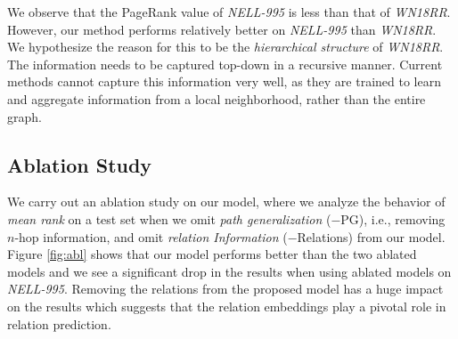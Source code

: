 \documentclass[11pt,a4paper]{article}
\begin{document}
We observe that the PageRank value of \emph{NELL-995} is less than that of \emph{WN18RR}. However, our method performs relatively better on \emph{NELL-995} than \emph{WN18RR}. We hypothesize the reason for this to be the \emph{hierarchical structure} of \emph{WN18RR}. The information needs to be captured top-down in a recursive manner. Current methods cannot capture this information very well, as they are trained to learn and aggregate information from a local neighborhood, rather than the entire graph. 
\fi

\begin{comment}
\begin{table}[t!]
\centering
\setlength{\tabcolsep}{6pt} \renewcommand{\arraystretch}{1} \begin{tabular}{l|c|c|c}
\hline
 Ablative & \multicolumn{3}{c}{NELL-995} \\
 \hline
 & 800 & 1500 & 3000 \\ 
\hline
Our model      & 1715  & 1587 & 1494   \\ 
\(-\)PG        & 1778  & 1630 & 1590    \\ 
\(-\)Relations & 5480  & 5346 & 5181     \\  

\hline
\end{tabular}
\caption{Comparison of our model with two ablated models: \(-\)PG and \(-\)Relations on test set Mean Rank (MR).  
  }
\end{table}
\end{comment}




\subsection{Ablation Study}
\label{sec:ablation}
We carry out an ablation study on our model, where we analyze the behavior of \emph{mean rank} on a test set when we omit \emph{path generalization} (\(-\)PG), i.e., removing \(n\)-hop information, and omit \emph{relation Information} (\(-\)Relations) from our model. Figure \ref{fig:abl} shows that our model performs better than the two ablated models and we see a significant drop in the results when using ablated models on \emph{NELL-995}. Removing the relations from the proposed model has a huge impact on the results which suggests that the relation embeddings play a pivotal role in relation prediction.  
\end{document}
